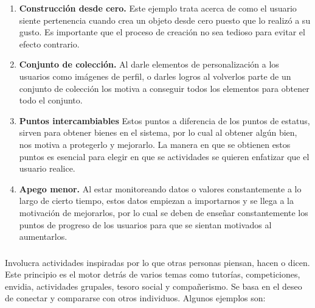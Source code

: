     \begin{enumerate}
    \item
    {\bf Construcción desde cero.} \cite[p. 182]{Octalysis}
        Este ejemplo trata acerca de como el usuario siente pertenencia cuando crea
        un objeto desde cero puesto que lo realizó a su gusto. Es importante que el
        proceso de creación no sea tedioso para evitar el efecto contrario.
        
    \item
    {\bf Conjunto de colección.} \cite[p. 183]{Octalysis}
        Al darle elementos de personalización a los usuarios como imágenes de perfil,
        o darles logros al volverlos parte de un conjunto de colección los motiva a
        conseguir todos los elementos para obtener todo el conjunto.
        
    \item
    {\bf Puntos intercambiables} \cite[p. 187]{Octalysis}
        Estos puntos a diferencia de los puntos de estatus, sirven para obtener bienes
        en el sistema, por lo cual al obtener algún bien, nos motiva a protegerlo y
        mejorarlo. La manera en que se obtienen estos puntos es esencial para elegir
        en que se actividades se quieren enfatizar que el usuario realice.
        
    \item
    {\bf Apego menor.} \cite[p. 189]{Octalysis}
        Al estar monitoreando datos o valores constantemente a lo largo de cierto tiempo,
        estos datos empiezan a importarnos y se llega a la motivación de mejorarlos,
        por lo cual se deben de enseñar constantemente los puntos de progreso de los
        usuarios para que se sientan motivados al aumentarlos.

    \end{enumerate}
    
\subsubsection{\principioV} \label{subsec:principioV}
    
 Involucra actividades inspiradas por lo que otras personas piensan, hacen o dicen. Este
 principio es el motor detrás de varios temas como tutorías, competiciones, envidia,
 actividades grupales, tesoro social y compañerismo. Se basa en el deseo de conectar y
 compararse con otros individuos.\cite[p. 197]{Octalysis} Algunos ejemplos son:
    
